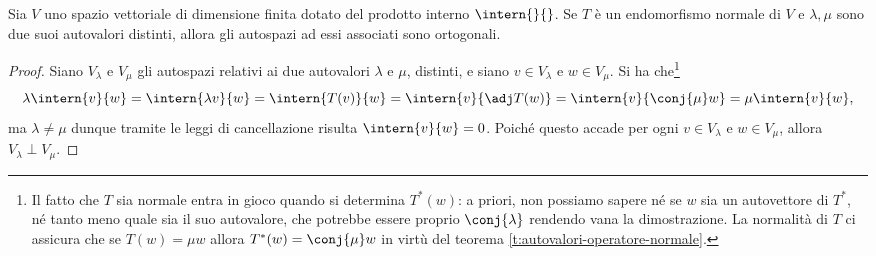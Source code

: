 \begin{proprieta} \label{pr:autospazi-ortogonali}
	Sia $V$ uno spazio vettoriale di dimensione finita dotato del prodotto interno $\intern{}{}$.
	Se $T$ è un endomorfismo normale di $V$ e $\lambda,\mu$ sono due suoi autovalori distinti, allora gli autospazi ad essi associati sono ortogonali.
\end{proprieta}
\begin{proof}
	Siano $V_\lambda$ e $V_\mu$ gli autospazi relativi ai due autovalori $\lambda$ e $\mu$, distinti, e siano $v\in V_\lambda$ e $w\in V_\mu$.
	Si ha che\footnote{Il fatto che $T$ sia normale entra in gioco quando si determina $T^*(w)$: a priori, non possiamo sapere n\'e se $w$ sia un autovettore di $T^*$, n\'e tanto meno quale sia il suo autovalore, che potrebbe essere proprio $\conj{\lambda}$ rendendo vana la dimostrazione. La normalità di $T$ ci assicura che se $T(w)=\mu w$ allora $T^*(w)=\conj{\mu}w$ in virtù del teorema \ref{t:autovalori-operatore-normale}.}
	\begin{equation}
		\lambda\intern{v}{w}=\intern{\lambda v}{w}=\intern{T(v)}{w}=\intern{v}{\adj T(w)}=\intern{v}{\conj{\mu}w}=\mu\intern{v}{w},
	\end{equation}
	ma $\lambda\ne\mu$ dunque tramite le leggi di cancellazione risulta $\intern{v}{w}=0$.
	Poich\'e questo accade per ogni $v\in V_\lambda$ e $w\in V_\mu$, allora $V_\lambda\perp V_\mu$.
\end{proof}

